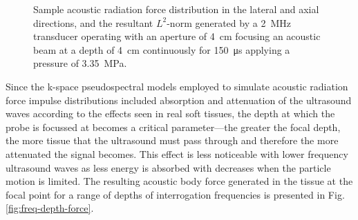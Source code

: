 \begin{figure}[!htb]
				\caption[Sample acoustic radiation force distribution]{Sample acoustic radiation force distribution in the \protect{} lateral and \protect{} axial directions, and \protect{} the resultant $L^2$-norm generated by a \SI{2}{\MHz} transducer operating with an aperture of \SI{4}{cm} focusing an acoustic beam at a depth of \SI{4}{\cm} continuously for \SI{150}{\us} applying a pressure of \SI{3.35}{\MPa}.}
				\label{fig:arfi_forces}
			\end{figure}

			Since the k-space pseudospectral models employed to simulate acoustic radiation force impulse distributions included absorption and attenuation of the ultrasound waves according to the effects seen in real soft tissues, the depth at which the probe is focussed at becomes a critical parameter---the greater the focal depth, the more tissue that the ultrasound must pass through and therefore the more attenuated the signal becomes. This effect is less noticeable with lower frequency ultrasound waves as less energy is absorbed with decreases when the particle motion is limited. The resulting acoustic body force generated in the tissue at the focal point for a range of depths of interrogation frequencies is presented in Fig. \ref{fig:freq-depth-force}.

